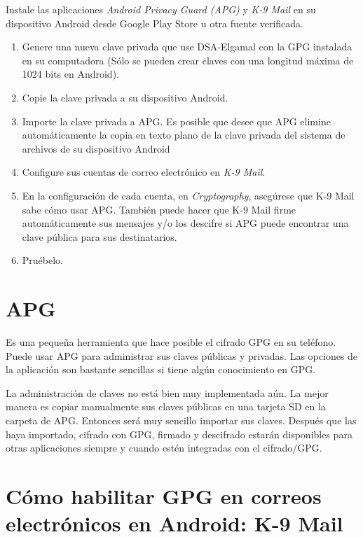 \documentclass[10pt,a5paper,twoside,,]{book}
\providecommand{\tightlist}{%
  \setlength{\itemsep}{0pt}\setlength{\parskip}{0pt}}
\begin{document}
Instale las aplicaciones \emph{Android Privacy Guard (APG)} y \emph{K-9
Mail} en su dispositivo Android desde Google Play Store u otra fuente
verificada.

\begin{enumerate}
\def\labelenumi{\arabic{enumi}.}
\tightlist
\item
  Genere una nueva clave privada que use DSA-Elgamal con la GPG
  instalada en su computadora (Sólo se pueden crear claves con una
  longitud máxima de 1024 bits en Android).
\item
  Copie la clave privada a su dispositivo Android.
\item
  Importe la clave privada a APG. Es posible que desee que APG elimine
  automáticamente la copia en texto plano de la clave privada del
  sistema de archivos de su dispositivo Android
\item
  Configure sus cuentas de correo electrónico en \emph{K-9 Mail}.
\item
  En la configuración de cada cuenta, en \emph{Cryptography}, asegúrese
  que K-9 Mail sabe cómo usar APG. También puede hacer que K-9 Mail
  firme automáticamente sus mensajes y/o los descifre si APG puede
  encontrar una clave pública para sus destinatarios.
\item
  Pruébelo.
\end{enumerate}

\section{APG}\label{apg}

Es una pequeña herramienta que hace posible el cifrado GPG en su
teléfono. Puede usar APG para administrar sus claves públicas y
privadas. Las opciones de la aplicación son bastante sencillas si tiene
algún conocimiento en GPG.

La administración de claves no está bien muy implementada aún. La mejor
manera es copiar manualmente sus claves públicas en una tarjeta SD en la
carpeta de APG. Entonces será muy sencillo importar sus claves. Después
que las haya importado, cifrado con GPG, firmado y descifrado estarán
disponibles para otras aplicaciones siempre y cuando estén integradas
con el cifrado/GPG.

\section{Cómo habilitar GPG en correos electrónicos en Android: K-9
Mail}\label{cuxf3mo-habilitar-gpg-en-correos-electruxf3nicos-en-android-k-9-mail}
\end{document}
